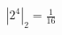 \documentclass[preview]{standalone}
\begin{document}
\begin{align*}
\left| 2^{4} \right|_2 = \frac{1}{16}
\end{align*}
\end{document}
